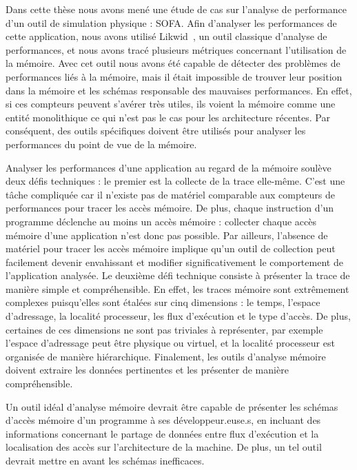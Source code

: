Dans cette thèse nous avons mené une étude de cas sur l'analyse de performance d'un outil de simulation physique : \gls{SOFA}.
Afin d'analyser les performances de cette application, nous avons utilisé \gls{Likwid}~\cite{Treibig10LIKWID}, un outil classique d'analyse de performances, et nous avons tracé plusieurs métriques concernant l'utilisation de la mémoire.
Avec cet outil nous avons été capable de détecter  des problèmes de performances liés à la mémoire, mais il était impossible de trouver leur position dans la mémoire et les schémas responsable des mauvaises performances.
En effet, si ces compteurs peuvent s'avérer très utiles, ils voient la mémoire comme une entité monolithique ce qui n'est pas le cas pour les architecture récentes.
Par conséquent, des outils spécifiques doivent être utilisés pour analyser les performances du point de vue de la mémoire.

Analyser les performances d'une application au regard de la mémoire soulève deux défis techniques : le premier est la collecte de la trace elle-même.
C'est une t\^ache compliquée car il n'existe pas de matériel comparable aux compteurs de performances pour tracer les accès mémoire.
De plus, chaque instruction d'un programme déclenche au moins un accès mémoire : collecter chaque accès mémoire d'une application n'est donc pas possible.
Par ailleurs, l'absence de matériel pour tracer les accès mémoire implique qu'un outil de collection peut facilement devenir envahissant et modifier  significativement le comportement de l'application analysée.
Le deuxième défi technique consiste à présenter la trace de manière simple et compréhensible.
En effet, les traces mémoire sont extrêmement complexes puisqu'elles sont étalées sur cinq dimensions : le temps, l'espace d'adressage, la localité processeur, les flux d'exécution et le type d'accès.
De plus, certaines de ces dimensions ne sont pas triviales à représenter, par exemple l'espace d'adressage peut être physique ou virtuel, et la localité processeur est organisée de manière hiérarchique.
Finalement, les outils d'analyse mémoire doivent extraire les données pertinentes et les présenter de manière compréhensible.

Un outil idéal d'analyse mémoire devrait être capable de présenter les schémas d'accès mémoire d'un programme à ses développeur.euse.s, en incluant des informations concernant le partage de données entre flux d'exécution et la localisation des accès  sur l'architecture de la machine.
De plus, un tel outil devrait mettre en avant les schémas inefficaces.

